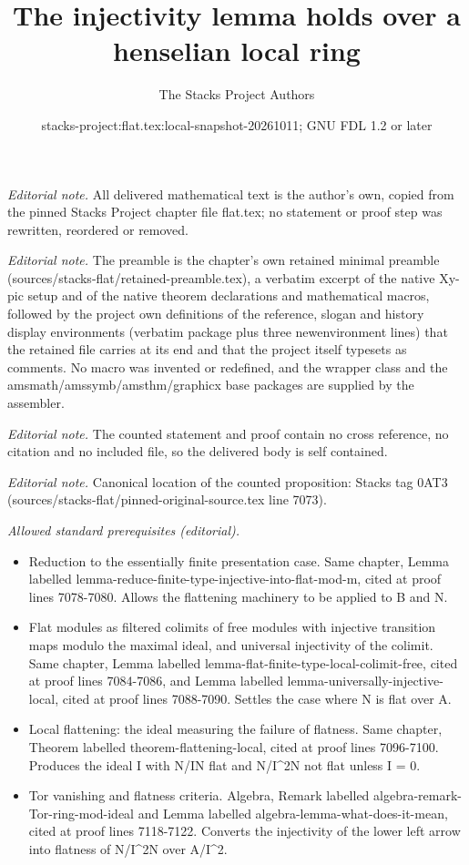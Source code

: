 \documentclass[10pt,a4paper]{amsart}
\title{The injectivity lemma holds over a henselian local ring}
\author{The Stacks Project Authors}
\date{stacks-project:flat.tex:local-snapshot-20261011; GNU FDL 1.2 or later}
\theoremstyle{plain}
\theoremstyle{definition}
\theoremstyle{remark}
\numberwithin{equation}{subsection}
\begin{document}
\maketitle
\noindent\textit{Editorial note.} All delivered mathematical text is the author's own, copied from the pinned Stacks Project chapter file flat.tex; no statement or proof step was rewritten, reordered or removed.\par\medskip
\noindent\textit{Editorial note.} The preamble is the chapter's own retained minimal preamble (sources/stacks-flat/retained-preamble.tex), a verbatim excerpt of the native Xy-pic setup and of the native theorem declarations and mathematical macros, followed by the project own definitions of the reference, slogan and history display environments (verbatim package plus three newenvironment lines) that the retained file carries at its end and that the project itself typesets as comments. No macro was invented or redefined, and the wrapper class and the amsmath/amssymb/amsthm/graphicx base packages are supplied by the assembler.\par\medskip
\noindent\textit{Editorial note.} The counted statement and proof contain no cross reference, no citation and no included file, so the delivered body is self contained.\par\medskip
\noindent\textit{Editorial note.} Canonical location of the counted proposition: Stacks tag 0AT3 (sources/stacks-flat/pinned-original-source.tex line 7073).\par\medskip
\noindent\textit{Allowed standard prerequisites (editorial).}\begin{itemize}
\item Reduction to the essentially finite presentation case. Same chapter, Lemma labelled lemma-reduce-finite-type-injective-into-flat-mod-m, cited at proof lines 7078-7080. Allows the flattening machinery to be applied to B and N.
\item Flat modules as filtered colimits of free modules with injective transition maps modulo the maximal ideal, and universal injectivity of the colimit. Same chapter, Lemma labelled lemma-flat-finite-type-local-colimit-free, cited at proof lines 7084-7086, and Lemma labelled lemma-universally-injective-local, cited at proof lines 7088-7090. Settles the case where N is flat over A.
\item Local flattening: the ideal measuring the failure of flatness. Same chapter, Theorem labelled theorem-flattening-local, cited at proof lines 7096-7100. Produces the ideal I with N/IN flat and N/I\textasciicircum{}2N not flat unless I = 0.
\item Tor vanishing and flatness criteria. Algebra, Remark labelled algebra-remark-Tor-ring-mod-ideal and Lemma labelled algebra-lemma-what-does-it-mean, cited at proof lines 7118-7122. Converts the injectivity of the lower left arrow into flatness of N/I\textasciicircum{}2N over A/I\textasciicircum{}2.
\end{itemize}\medskip
\end{document}
